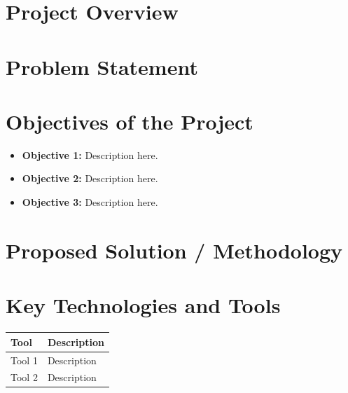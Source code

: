 \documentclass[12pt,a4paper]{report}
\begin{document}
\newpage
\thispagestyle{empty}
\tableofcontents

\newpage
{}
\setcounter{page}{1}

\section{Project Overview}

\section{Problem Statement}

\section{Objectives of the Project}
\begin{itemize}
\item \textbf{Objective 1:} Description here.
\item \textbf{Objective 2:} Description here.
\item \textbf{Objective 3:} Description here.
\end{itemize}

\section{Proposed Solution / Methodology}

\section{Key Technologies and Tools}
\begin{table}[H]
\centering
\begin{tabular}{|p{4.5cm}|p{10cm}|}
\toprule
\textbf{Tool} & \textbf{Description} \\
\midrule
Tool 1 & Description \\
\midrule
Tool 2 & Description \\
\bottomrule
\end{tabular}
\end{table}
\end{document}
